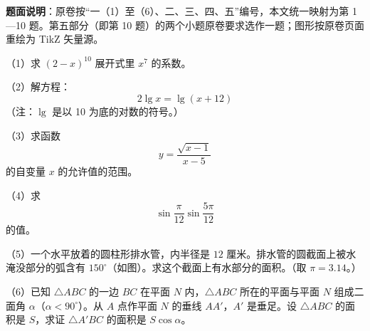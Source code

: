 

\begin{gktip}
\textbf{题面说明}：原卷按“一（1）至（6）、二、三、四、五”编号，本文统一映射为第 1—10 题。第五部分（即第 10 题）的两个小题原卷要求选作一题；图形按原卷页面重绘为 TikZ 矢量源。
\end{gktip}


\begin{question}
（1）求 $(2-x)^{10}$ 展开式里 $x^7$ 的系数。

\end{question}
\begin{question}
（2）解方程：
\nopagebreak[4]
\[
2\lg x=\lg(x+12)
\]
（注：$\lg$ 是以 10 为底的对数的符号。）

\end{question}
\begin{question}
（3）求函数
\nopagebreak[4]
\[
y=\frac{\sqrt{x-1}}{x-5}
\]
的自变量 $x$ 的允许值的范围。

\end{question}
\begin{question}
（4）求
\nopagebreak[4]
\[
\sin\frac{\pi}{12}\sin\frac{5\pi}{12}
\]
的值。

\Needspace{0.4\textheight}
\end{question}
\begin{question}
（5）一个水平放着的圆柱形排水管，内半径是 $12$ 厘米。排水管的圆截面上被水淹没部分的弧含有 $150^\circ$（如图）。求这个截面上有水部分的面积。（取 $\pi=3.14$。）
\nopagebreak[4]
\begin{center}\end{center}
\nopagebreak[4]
\end{question}
\begin{question}
（6）已知 $\triangle ABC$ 的一边 $BC$ 在平面 $N$ 内，$\triangle ABC$ 所在的平面与平面 $N$ 组成二面角 $\alpha$（$\alpha<90^\circ$）。从 $A$ 点作平面 $N$ 的垂线 $AA'$，$A'$ 是垂足。设 $\triangle ABC$ 的面积是 $S$，求证 $\triangle A'BC$ 的面积是 $S\cos\alpha$。

\end{question}

